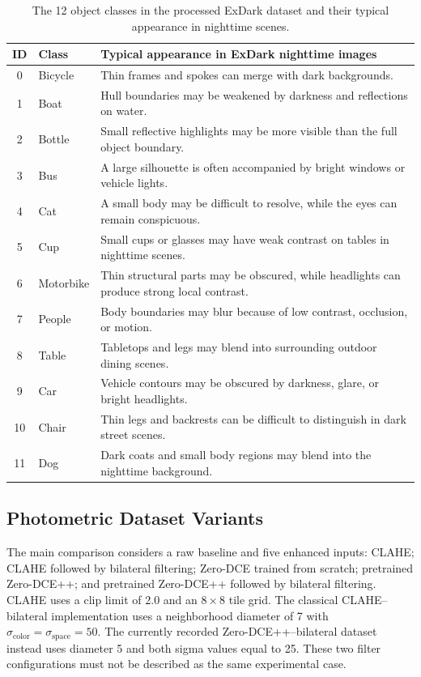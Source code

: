 \documentclass[11pt,a4paper]{article}
\begin{document}
\begin{table}[H]
\centering
\caption{The 12 object classes in the processed ExDark dataset and their
typical appearance in nighttime scenes.}
\label{tab:exdark-class-labels}
\footnotesize
\begin{tabularx}{\textwidth}{c l X}
\toprule
\textbf{ID} & \textbf{Class} &
\textbf{Typical appearance in ExDark nighttime images} \\
\midrule
0  & Bicycle   & Thin frames and spokes can merge with dark backgrounds. \\
1  & Boat      & Hull boundaries may be weakened by darkness and reflections on water. \\
2  & Bottle    & Small reflective highlights may be more visible than the full object boundary. \\
3  & Bus       & A large silhouette is often accompanied by bright windows or vehicle lights. \\
4  & Cat       & A small body may be difficult to resolve, while the eyes can remain conspicuous. \\
5  & Cup       & Small cups or glasses may have weak contrast on tables in nighttime scenes. \\
6  & Motorbike & Thin structural parts may be obscured, while headlights can produce strong local contrast. \\
7  & People    & Body boundaries may blur because of low contrast, occlusion, or motion. \\
8  & Table     & Tabletops and legs may blend into surrounding outdoor dining scenes. \\
9  & Car       & Vehicle contours may be obscured by darkness, glare, or bright headlights. \\
10 & Chair     & Thin legs and backrests can be difficult to distinguish in dark street scenes. \\
11 & Dog       & Dark coats and small body regions may blend into the nighttime background. \\
\bottomrule
\end{tabularx}
\end{table}

\subsection{Photometric Dataset Variants}

The main comparison considers a raw baseline and five enhanced inputs: CLAHE;
CLAHE followed by bilateral filtering; Zero-DCE trained from scratch;
pretrained Zero-DCE++; and pretrained Zero-DCE++ followed by bilateral
filtering.
CLAHE uses a clip limit of 2.0 and an \(8\times8\) tile grid. The classical
CLAHE--bilateral implementation uses a
neighborhood diameter of 7 with \(\sigma_{\mathrm{color}}=
\sigma_{\mathrm{space}}=50\). The currently recorded Zero-DCE++--bilateral
dataset instead uses diameter 5 and both sigma values equal to 25. These two
filter configurations must not be described as the same experimental case.
\end{document}
